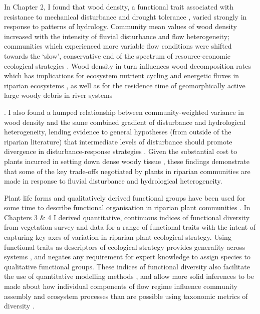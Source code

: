 \documentclass[openright,12pt,a4paper]{memoir}
\begin{document}
In Chapter 2, I found that wood density, a functional trait associated with resistance to mechanical disturbance and drought tolerance \citep{Chave2009, Niklas2010}, varied strongly in response to patterns of hydrology. Community mean values of wood density increased with the intensity of fluvial disturbance and flow heterogeneity; communities which experienced more variable flow conditions were shifted towards the ‘slow’, conservative end of the spectrum of resource-economic ecological strategies \citep{Reich2014a}. Wood density in turn influences wood decomposition rates \citep{Mori2013} which has implications for ecosystem nutrient cycling and energetic fluxes in riparian ecosystems \citep{Harmon1986}, as well as for the residence time of geomorphically active large woody debris in river systems {\citep{Gurnell2002, Cadol2010}. I also found a humped relationship between community-weighted variance in wood density and the same combined gradient of disturbance and hydrological heterogeneity, lending evidence to general hypotheses (from outside of the riparian literature) that intermediate levels of disturbance should promote divergence in disturbance-response strategies \citep{Grime2006, Sonnier2010}. Given the substantial cost to plants incurred in setting down dense woody tissue \citep{Falster2006}, these findings demonstrate that some of the key trade-offs negotiated by plants in riparian communities are made in response to fluvial disturbance and hydrological heterogeneity.
 
Plant life forms and qualitatively derived functional groups have been used for some time to describe functional organisation in riparian plant communities \citep{Brinson1993, Stromberg2010, Stromberg2013}. In Chapters 3 \& 4 I derived quantitative, continuous indices of functional diversity from vegetation survey and data for a range of functional traits with the intent of capturing key axes of variation in riparian plant ecological strategy. Using functional traits as descriptors of ecological strategy provides generality across systems \citep{Lavorel2002, Suding2008}, and negates any requirement for expert knowledge to assign species to qualitative functional groups. These indices of functional diversity also facilitate the use of quantitative modelling methods \citep{Mason2013}, and allow more solid inferences to be made about how individual components of flow regime influence community assembly and ecosystem processes than are possible using taxonomic metrics of diversity \citep{Tilman1997, Diaz1998}.

}
\end{document}
